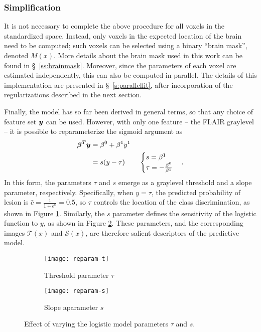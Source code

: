 \subsubsection{Simplification}\label{ss:meth-simple}
It is not necessary to complete the above procedure for all voxels in the standardized space.
Instead, only voxels in the expected location of the brain need to be computed; such voxels can be selected using a binary ``brain mask'', denoted $M(x)$.
More details about the brain mask used in this work can be found in \S\ \ref{ss:brainmask}.
Moreover, since the parameters of each voxel are estimated independently, this can also be computed in parallel.
The details of this implementation are presented in \S\ \ref{s:parallelfit}, after incorporation of the regularizations described in the next section.
\par
Finally, the model has so far been derived in general terms, so that any choice of feature set $\bm{y}$ can be used.
However, with only one feature -- the FLAIR graylevel -- it is possible to reparameterize the sigmoid argument as
\begin{align}
\bm{\beta}^T\bm{y} &= \beta^0 + \beta^1 y^1\nonumber\\
&= s(y-\tau) \qquad\begin{cases} s = \beta^1\\ \tau = -\frac{\beta^0}{\beta^1} \end{cases}.
\label{eq:reparameterize}
\end{align}
In this form, the parameters $\tau$ and $s$ emerge as a graylevel threshold and a slope parameter, respectively.
Specifically, when $y = \tau$, the predicted probability of lesion is $\hat{c} = \tfrac{1}{1+e^{0}} = 0.5$, so $\tau$ controls the location of the class discrimination, as shown in Figure \ref{fig:reparam-t}.
Similarly, the $s$ parameter defines the sensitivity of the logistic function to $y$, as shown in Figure \ref{fig:reparam-s}.
These parameters, and the corresponding images $\mathcal{T}(x)$ and $\mathcal{S}(x)$, are therefore salient descriptors of the predictive model.
\begin{figure}
  \centering
  \begin{subfigure}{\plotwidth}\texttt{[image: reparam-t]}\caption{Threshold parameter $\tau$}\label{fig:reparam-t}\end{subfigure}
  \begin{subfigure}{\plotwidth}\texttt{[image: reparam-s]}\caption{Slope aparameter $s$}      \label{fig:reparam-s}\end{subfigure}
  \caption{Effect of varying the logistic model parameters $\tau$ and $s$.}
  \label{fig:reparam}
\end{figure}
